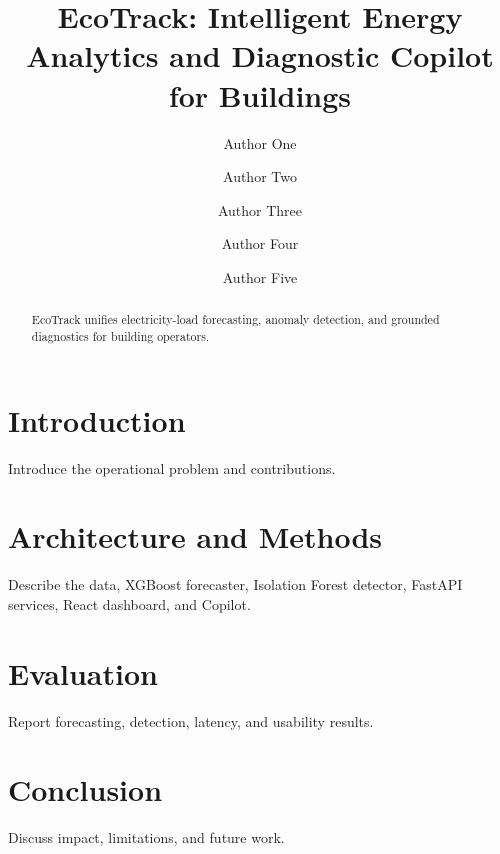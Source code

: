 \documentclass[runningheads]{llncs}
\title{EcoTrack: Intelligent Energy Analytics and Diagnostic Copilot for Buildings}
\author{Author One \and Author Two \and Author Three \and Author Four \and Author Five}
\institute{Institution Name\\\email{contact@example.com}}
\begin{document}
\maketitle
\begin{abstract}
EcoTrack unifies electricity-load forecasting, anomaly detection, and grounded diagnostics for building operators.
\end{abstract}
\section{Introduction}
Introduce the operational problem and contributions.
\section{Architecture and Methods}
Describe the data, XGBoost forecaster, Isolation Forest detector, FastAPI services, React dashboard, and Copilot.
\section{Evaluation}
Report forecasting, detection, latency, and usability results.
\section{Conclusion}
Discuss impact, limitations, and future work.


\end{document}
